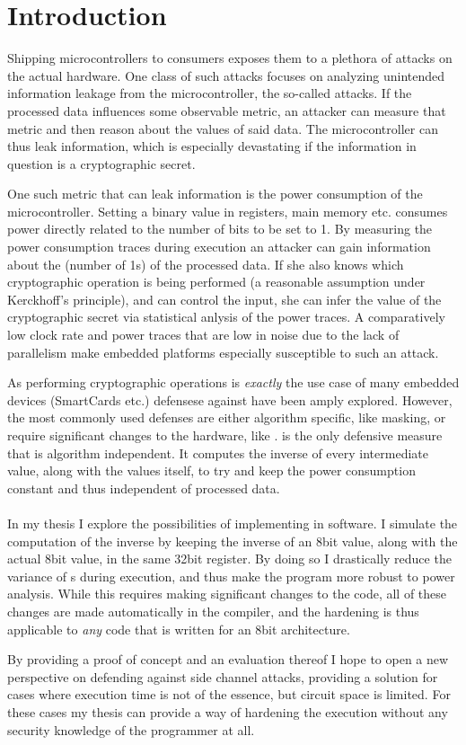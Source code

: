 \section{Introduction}
Shipping microcontrollers to consumers exposes them to a plethora of attacks on the actual hardware.
One class of such attacks focuses on analyzing unintended information leakage from the microcontroller, the so-called \sidechannel{} attacks.
If the processed data influences some observable metric, an attacker can measure that metric and then reason about the values of said data.
The microcontroller can thus leak information, which is especially devastating if the information in question is a cryptographic secret.

One such metric that can leak information is the power consumption of the microcontroller.
Setting a binary value in registers, main memory etc. consumes power directly related to the number of bits to be set to 1.
By measuring the power consumption traces during execution an attacker can gain information about the \hammingw{} (number of 1s) of the processed data.
If she also knows which cryptographic operation is being performed (a reasonable assumption under Kerckhoff's principle), and can control the input, she can infer the value of the cryptographic secret via statistical anlysis of the power traces.
A comparatively low clock rate and power traces that are low in noise due to the lack of parallelism make embedded platforms especially susceptible to such an attack.

As performing cryptographic operations is \emph{exactly} the use case of many embedded devices (SmartCards etc.) defensese against \poweranalysis{} have been amply explored.
However, the most commonly used defenses are either algorithm specific, like masking, or require significant changes to the hardware, like \dual{}.
\dual{} is the only defensive measure that is algorithm independent.
It computes the inverse of every intermediate value, along with the values itself, to try and keep the power consumption constant and thus independent of processed data.
\\
\\
In my thesis I explore the possibilities of implementing \dual{} in software.
I simulate the computation of the inverse by keeping the inverse of an 8bit value, along with the actual 8bit value, in the same 32bit register.
By doing so I drastically reduce the variance of \hammingw{}s during execution, and thus make the program more robust to power analysis.
While this requires making significant changes to the code, all of these changes are made automatically in the compiler, and the hardening is thus applicable to \emph{any} code that is written for an 8bit architecture.

By providing a proof of concept and an evaluation thereof I hope to open a new perspective on defending against side channel attacks, providing a solution for cases where execution time is not of the essence, but circuit space is limited.
For these cases my thesis can provide a way of hardening the execution without any security knowledge of the programmer at all.
